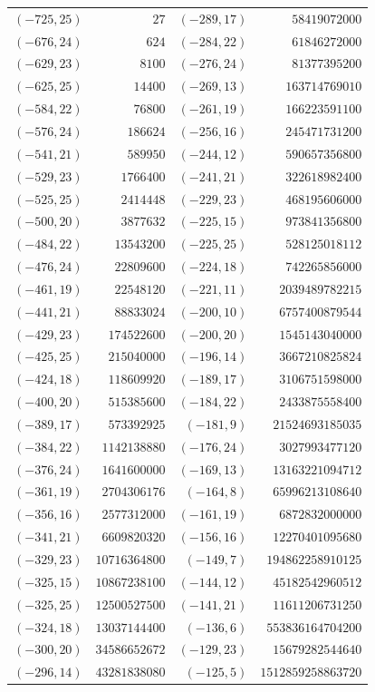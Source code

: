 \documentclass[11pt]{amsart}
\theoremstyle{definition}
\begin{document}
{\scriptsize\begin{tabular}{@{}r@{\ \ }r@{\qquad}r@{\ \ }r@{}}
$(-725,25)$ & $27$ & $(-289,17)$ & $58419072000$ \\
$(-676,24)$ & $624$ & $(-284,22)$ & $61846272000$ \\
$(-629,23)$ & $8100$ & $(-276,24)$ & $81377395200$ \\
$(-625,25)$ & $14400$ & $(-269,13)$ & $163714769010$ \\
$(-584,22)$ & $76800$ & $(-261,19)$ & $166223591100$ \\
$(-576,24)$ & $186624$ & $(-256,16)$ & $245471731200$ \\
$(-541,21)$ & $589950$ & $(-244,12)$ & $590657356800$ \\
$(-529,23)$ & $1766400$ & $(-241,21)$ & $322618982400$ \\
$(-525,25)$ & $2414448$ & $(-229,23)$ & $468195606000$ \\
$(-500,20)$ & $3877632$ & $(-225,15)$ & $973841356800$ \\
$(-484,22)$ & $13543200$ & $(-225,25)$ & $528125018112$ \\
$(-476,24)$ & $22809600$ & $(-224,18)$ & $742265856000$ \\
$(-461,19)$ & $22548120$ & $(-221,11)$ & $2039489782215$ \\
$(-441,21)$ & $88833024$ & $(-200,10)$ & $6757400879544$ \\
$(-429,23)$ & $174522600$ & $(-200,20)$ & $1545143040000$ \\
$(-425,25)$ & $215040000$ & $(-196,14)$ & $3667210825824$ \\
$(-424,18)$ & $118609920$ & $(-189,17)$ & $3106751598000$ \\
$(-400,20)$ & $515385600$ & $(-184,22)$ & $2433875558400$ \\
$(-389,17)$ & $573392925$ & $(-181,9)$ & $21524693185035$ \\
$(-384,22)$ & $1142138880$ & $(-176,24)$ & $3027993477120$ \\
$(-376,24)$ & $1641600000$ & $(-169,13)$ & $13163221094712$ \\
$(-361,19)$ & $2704306176$ & $(-164,8)$ & $65996213108640$ \\
$(-356,16)$ & $2577312000$ & $(-161,19)$ & $6872832000000$ \\
$(-341,21)$ & $6609820320$ & $(-156,16)$ & $12270401095680$ \\
$(-329,23)$ & $10716364800$ & $(-149,7)$ & $194862258910125$ \\
$(-325,15)$ & $10867238100$ & $(-144,12)$ & $45182542960512$ \\
$(-325,25)$ & $12500527500$ & $(-141,21)$ & $11611206731250$ \\
$(-324,18)$ & $13037144400$ & $(-136,6)$ & $553836164704200$ \\
$(-300,20)$ & $34586652672$ & $(-129,23)$ & $15679282544640$ \\
$(-296,14)$ & $43281838080$ & $(-125,5)$ & $1512859258863720$ \\
\end{tabular}}\par
\end{document}
